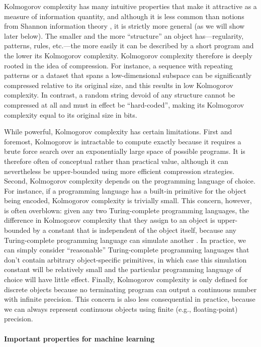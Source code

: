 \documentclass{article} %
\begin{document}
\begin{appendices}
Kolmogorov complexity has many intuitive properties that make it attractive as a measure of information quantity, and although it is less common than notions from Shannon information theory \citep{shannon2001mathematical}, it is strictly more general (as we will show later below). The smaller and the more ``structure'' an object has---regularity, patterns, rules, etc.---the more easily it can be described by a short program and the lower its Kolmogorov complexity. Kolmogorov complexity therefore is deeply rooted in the idea of compression. For instance, a sequence with repeating patterns or a dataset that spans a low-dimensional subspace can be significantly compressed relative to its original size, and this results in low Kolmogorov complexity. In contrast, a random string devoid of any structure cannot be compressed at all and must in effect be ``hard-coded'', making its Kolmogorov complexity equal to its original size in bits.

While powerful, Kolmogorov complexity has certain limitations. First and foremost, Kolmogorov is intractable to compute exactly because it requires a brute force search over an exponentially large space of possible programs. It is therefore often of conceptual rather than practical value, although it can nevertheless be upper-bounded using more efficient compression strategies. Second, Kolmogorov complexity depends on the programming language of choice. For instance, if a programming language has a built-in primitive for the object being encoded, Kolmogorov complexity is trivially small. This concern, however, is often overblown: given any two Turing-complete programming languages, the difference in Kolmogorov complexity that they assign to an object is upper-bounded by a constant that is independent of the object itself, because any Turing-complete programming language can simulate another \citep{grunwald2003kolmogorov,fortnow2000kolmogorov}. In practice, we can simply consider ``reasonable'' Turing-complete programming languages that don't contain arbitrary object-specific primitives, in which case this simulation constant will be relatively small and the particular programming language of choice will have little effect. Finally, Kolmogorov complexity is only defined for discrete objects because no terminating program can output a continuous number with infinite precision. This concern is also less consequential in practice, because we can always represent continuous objects using finite (e.g., floating-point) precision.

\paragraph{Important properties for machine learning}


\end{appendices}
\end{document}
